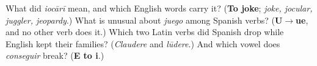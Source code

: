 \begin{tcolorbox}[breakable,colback=teal!4,colframe=teal!35!black,title={Before you move on}]
What did \emph{iocārī} mean, and which English words carry it? (\textbf{To joke}; \emph{joke, jocular, juggler, jeopardy}.) What is unusual about \emph{juego} among Spanish verbs? (\textbf{U$\to$ue}, and no other verb does it.) Which two Latin verbs did Spanish drop while English kept their families? (\emph{Claudere} and \emph{lūdere}.) And which vowel does \emph{conseguir} break? (\textbf{E to i}.)
\end{tcolorbox}
